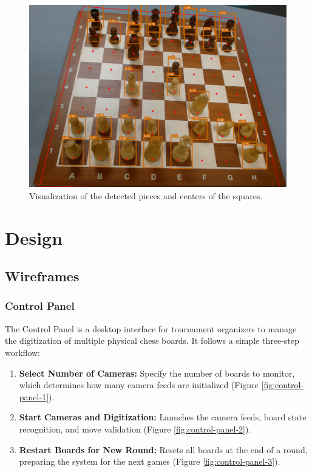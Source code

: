 \begin{figure}[h!]
    \centering
    \includegraphics[width=0.75\linewidth]{figures/methods/ml-models/piece-model.png}
    \caption[Visualization of piece model and corner model]{Visualization of the detected pieces and centers of the squares.}
    \label{fig:websocket-vs-http}
\end{figure}

\section{Design}

\subsection{Wireframes}
\label{subsec:wireframe}

\subsubsection*{Control Panel}

The Control Panel is a desktop interface for tournament organizers to manage the digitization of multiple physical chess boards. It follows a simple three-step workflow:

\begin{enumerate}
\item \textbf{Select Number of Cameras:} Specify the number of boards to monitor, which determines how many camera feeds are initialized (Figure \ref{fig:control-panel-1}).
\item \textbf{Start Cameras and Digitization:} Launches the camera feeds, board state recognition, and move validation (Figure \ref{fig:control-panel-2}).
\item \textbf{Restart Boards for New Round:} Resets all boards at the end of a round, preparing the system for the next games (Figure \ref{fig:control-panel-3}).
\end{enumerate}

